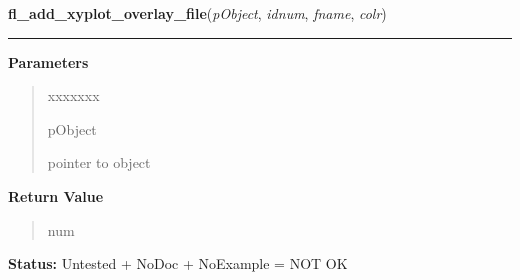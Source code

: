 \hspace{.8\funcindent}\begin{boxedminipage}{\funcwidth}

    \raggedright \textbf{fl\_add\_xyplot\_overlay\_file}(\textit{pObject}, \textit{idnum}, \textit{fname}, \textit{colr})

    \vspace{-1.5ex}

    \rule{\textwidth}{0.5\fboxrule}
\setlength{\parskip}{2ex}
\setlength{\parskip}{1ex}
      \textbf{Parameters}
      \vspace{-1ex}

      \begin{quote}
        \begin{Ventry}{xxxxxxx}

          \item[pObject]

          pointer to object

        \end{Ventry}

      \end{quote}

      \textbf{Return Value}
    \vspace{-1ex}

      \begin{quote}
      num

      \end{quote}

\textbf{Status:} Untested + NoDoc + NoExample = NOT OK



    \end{boxedminipage}

    \label{xformslib:library:fl_set_xyplot_return}

    \vspace{0.5ex}

